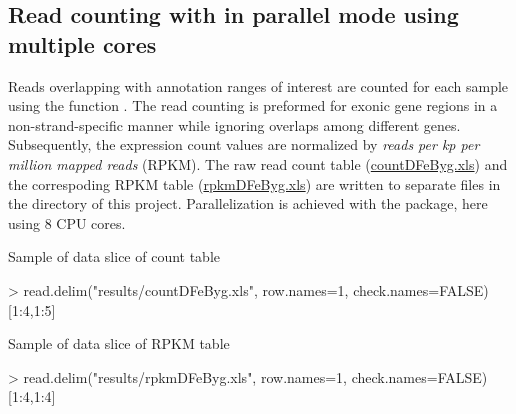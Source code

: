 \documentclass{article}
\begin{document}
\subsection{Read counting with  in parallel mode using multiple cores}
Reads overlapping with annotation ranges of interest are counted for each sample using the  function \citep{Lawrence2013-kt}. The read counting is preformed for exonic gene regions in a non-strand-specific manner while ignoring overlaps among different genes. Subsequently, the expression count values are normalized by \textit{reads per kp per million mapped reads} (RPKM). The raw read count table (\href{run:./results/countDFeByg.xls}{countDFeByg.xls}) and the correspoding RPKM table (\href{run:./results/rpkmDFeByg.xls}{rpkmDFeByg.xls}) are written to separate files in the  directory of this project. Parallelization is achieved with the  package, here using 8 CPU cores.
\begin{Schunk}
\end{Schunk}
Sample of data slice of count table
\begin{Schunk}
\begin{Sinput}
> read.delim("results/countDFeByg.xls", row.names=1, check.names=FALSE)[1:4,1:5]
\end{Sinput}
\end{Schunk}
Sample of data slice of RPKM table
\begin{Schunk}
\begin{Sinput}
> read.delim("results/rpkmDFeByg.xls", row.names=1, check.names=FALSE)[1:4,1:4]
\end{Sinput}
\end{Schunk}
\end{document}
